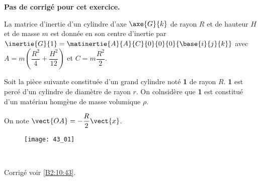 \normaltrue \difficilefalse \tdifficilefalse
\correctionfalse


\setcounter{question}{0}
\ifcorrection
\else
\textbf{Pas de corrigé pour cet exercice.}
\fi




\ifprof
\else
La matrice d'inertie d'un cylindre d'axe $\axe{G}{k}$ de rayon $R$ et de hauteur $H$ et de masse $m$ est donnée en son centre d'inertie par 
$\inertie{G}{1}=\matinertie{A}{A}{C}{0}{0}{0}{\base{i}{j}{k}}$ avec $A=m\left(\dfrac{R^2}{4}+\dfrac{H^2}{12} \right)$ et $C=m\dfrac{R^2}{2}$. 

Soit la pièce suivante constituée d'un grand cylindre noté \textbf{1} de rayon $R$.  \textbf{1} est percé d'un cylindre de diamètre de rayon $r$. On colnsidère que \textbf{1} est constitué d'un matériau homgène de masse volumique $\rho$. 

On note $\vect{OA}=-\dfrac{R}{2}\vect{x}$. 
\begin{figure}[H]
\centering
\texttt{[image: 43\_01]}
\end{figure}
\fi


\ifprof
\else
\fi

\ifprof ~\\
\else
\fi


\ifprof
\else
\begin{flushright}
\footnotesize{Corrigé voir \ref{B2:10:43}.}
\end{flushright}%
\fi